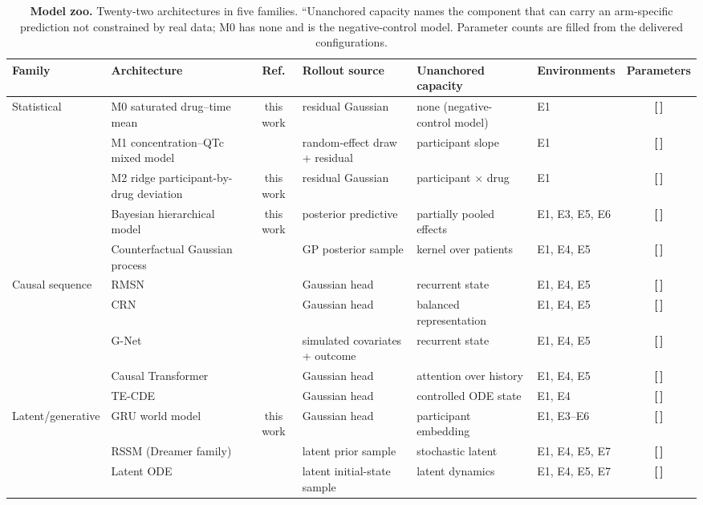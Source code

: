 \documentclass[11pt,a4paper]{article}
\newcommand{\T}{{\color{red}\textbf{[\,]}}}
\begin{document}
\begin{table}[!htbp]\centering\scriptsize
\caption{\textbf{Model zoo.} Twenty-two architectures in five families. ``Unanchored capacity names the component that can carry an arm-specific prediction not constrained by real data; M0 has none and is the negative-control model. Parameter counts are filled from the delivered configurations.}
\begin{tabularx}{\textwidth}{@{}p{1.7cm} Y c p{2.3cm} p{2.4cm} p{1.7cm} c@{}}\toprule
Family & Architecture & Ref. & Rollout source & Unanchored capacity & Environments & Parameters\\\midrule
Statistical & M0 saturated drug--time mean & this work & residual Gaussian & none (negative-control model) & E1 & \T\\
 & M1 concentration--QTc mixed model & \cite{garnett2018cqtc} & random-effect draw + residual & participant slope & E1 & \T\\
 & M2 ridge participant-by-drug deviation & this work & residual Gaussian & participant $\times$ drug & E1 & \T\\
 & Bayesian hierarchical model & this work & posterior predictive & partially pooled effects & E1, E3, E5, E6 & \T\\
 & Counterfactual Gaussian process & \cite{schulam2017cgp} & GP posterior sample & kernel over patients & E1, E4, E5 & \T\\
Causal sequence & RMSN & \cite{lim2018rmsn} & Gaussian head & recurrent state & E1, E4, E5 & \T\\
 & CRN & \cite{bica2020crn} & Gaussian head & balanced representation & E1, E4, E5 & \T\\
 & G-Net & \cite{li2021gnet} & simulated covariates + outcome & recurrent state & E1, E4, E5 & \T\\
 & Causal Transformer & \cite{causaltransformer2022} & Gaussian head & attention over history & E1, E4, E5 & \T\\
 & TE-CDE & \cite{seedat2022tecde} & Gaussian head & controlled ODE state & E1, E4 & \T\\
Latent/generative & GRU world model & this work & Gaussian head & participant embedding & E1, E3--E6 & \T\\
 & RSSM (Dreamer family) & \cite{hafner2025dreamer} & latent prior sample & stochastic latent & E1, E4, E5, E7 & \T\\
 & Latent ODE & \cite{rubanova2019latentode} & latent initial-state sample & latent dynamics & E1, E4, E5, E7 & \T\\

\end{tabularx}
\end{table}
\end{document}
